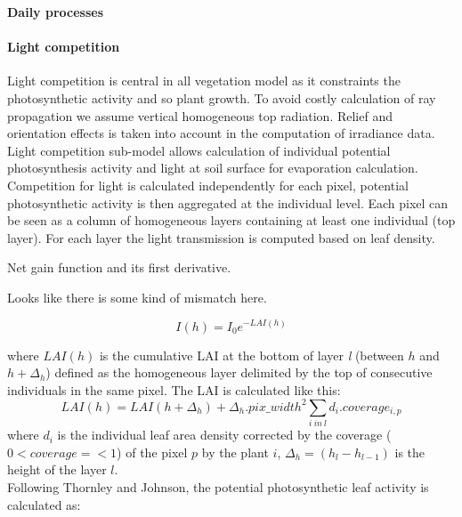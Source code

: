 \documentclass[a4paper,twoside, justified,marginals=raggedright, nobib]{tufte-handout}
\begin{document}
\textbf{Daily processes}

\paragraph{Light competition}Light competition is central in all vegetation model as it constraints the photosynthetic activity and so plant growth. To avoid costly calculation of ray propagation we assume vertical homogeneous top radiation. Relief and orientation effects is taken into account in the computation of irradiance data.\\
Light competition sub-model allows calculation of individual potential photosynthesis activity and light at soil surface for evaporation calculation.\\
Competition for light is calculated independently for each pixel, potential photosynthetic activity is then aggregated at the individual level. Each pixel can be seen as a column of homogeneous layers containing at least one individual (top layer). For each layer the light transmission is computed based on leaf density.


\begin{marginfigure}
\label{fig:derivaives}
\caption{Net gain function and its first derivative.} Looks like there is some kind of mismatch here.
\end{marginfigure}

\begin{equation}\label{eq:Ih}
I(h) =  I_{0} e^{-LAI(h)}
\end{equation}

where $LAI(h)$ is the cumulative LAI at the bottom of layer \textit{l} (between $h$ and $h+\Delta_{h}$) defined as the homogeneous layer delimited by the top of consecutive individuals in the same pixel. The LAI is calculated like this:
\begin{equation}\label{eq:LAI}
LAI(h) = LAI(h+\Delta_{h}) +   \Delta_{h} . pix\_width^{2} \sum_{i\ in\ l}d_{i}.coverage_{i, p}
\end{equation}
where $d_{i}$ is the individual leaf area density corrected by the coverage ($0< coverage =< 1$) of the pixel $p$ by the plant $i$, $\Delta_{h} = (h_{l} - h_{l-1})$ is the height of the layer $l$.\\
Following Thornley and Johnson, the potential photosynthetic leaf activity is calculated as:
\end{document}
